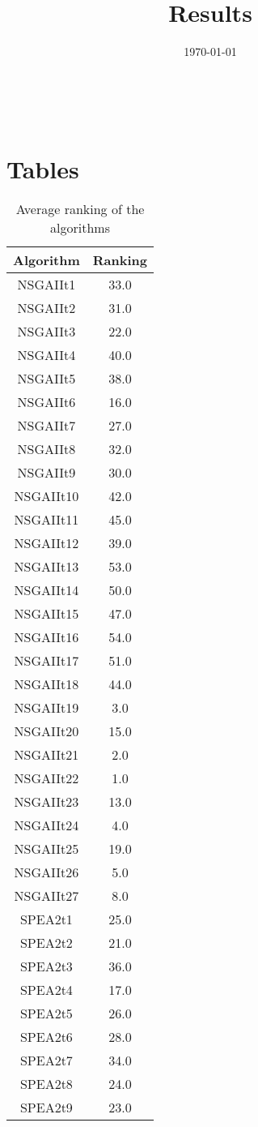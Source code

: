 \documentclass{article}
\title{Results}
\author{}
\date{\today}
\begin{document}
\oddsidemargin 0in \topmargin 0in\maketitle
\
\section{Tables}
\begin{table}[!htp]
\centering
\caption{Average ranking of the algorithms}
\begin{tabular}{c|c}
Algorithm&Ranking\\
\hline
NSGAIIt1&33.0\\
NSGAIIt2&31.0\\
NSGAIIt3&22.0\\
NSGAIIt4&40.0\\
NSGAIIt5&38.0\\
NSGAIIt6&16.0\\
NSGAIIt7&27.0\\
NSGAIIt8&32.0\\
NSGAIIt9&30.0\\
NSGAIIt10&42.0\\
NSGAIIt11&45.0\\
NSGAIIt12&39.0\\
NSGAIIt13&53.0\\
NSGAIIt14&50.0\\
NSGAIIt15&47.0\\
NSGAIIt16&54.0\\
NSGAIIt17&51.0\\
NSGAIIt18&44.0\\
NSGAIIt19&3.0\\
NSGAIIt20&15.0\\
NSGAIIt21&2.0\\
NSGAIIt22&1.0\\
NSGAIIt23&13.0\\
NSGAIIt24&4.0\\
NSGAIIt25&19.0\\
NSGAIIt26&5.0\\
NSGAIIt27&8.0\\
SPEA2t1&25.0\\
SPEA2t2&21.0\\
SPEA2t3&36.0\\
SPEA2t4&17.0\\
SPEA2t5&26.0\\
SPEA2t6&28.0\\
SPEA2t7&34.0\\
SPEA2t8&24.0\\
SPEA2t9&23.0\\

\end{tabular}
\end{table}
\end{document}
